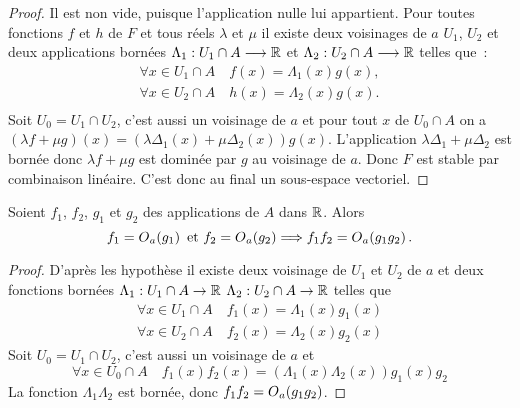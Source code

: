 \begin{proof}
  Il est non vide, puisque l'application nulle lui appartient. Pour toutes 
  fonctions \(f\) et \(h\) de \(F\) et tous réels \(\lambda\) et \(\mu\) il 
  existe deux voisinages de \(a\) \(U_1\), \(U_2\) et deux  applications bornées 
  \(\Lambda_1:U_1 \cap A \longrightarrow \mathbb{R}\) et \(\Lambda_2:U_2 \cap A 
  \longrightarrow \mathbb{R}\)  telles que~:
  \begin{gather}
    \forall x \in U_1\cap A \quad f(x)=\Lambda_1(x)g(x),\\
    \forall x \in U_2\cap A \quad h(x)=\Lambda_2(x)g(x).\\
  \end{gather}
  Soit \(U_0=U_1 \cap U_2\), c'est aussi un voisinage de \(a\) et pour tout 
  \(x\) de \(U_0 \cap A\) on a \((\lambda f +\mu 
  g)(x)=(\lambda\Delta_1(x)+\mu\Delta_2(x))g(x)\). L'application 
  \(\lambda\Delta_1+\mu\Delta_2\) est bornée donc \(\lambda f + \mu g\) est 
  dominée par \(g\) au voisinage de \(a\). Donc \(F\) est stable par combinaison 
  linéaire. C'est donc au final un sous-espace vectoriel.
\end{proof}
\begin{prop}
  Soient \(f_1\), \(f_2\), \(g_1\) et \(g_2\) des applications de \(A\) dans 
  \(\mathbb{R}\). Alors
  \begin{equation}
    f_1=O\mathopen{}_{a}\left(g_1\right) \text{~et~} f_2=O\mathopen{}_{a}\left(g_2\right) \Longrightarrow f_1f_2 
    = O\mathopen{}_{a}\left(g_1g_2\right).
  \end{equation}
\end{prop}
\begin{proof}
  D'après les hypothèse il existe deux voisinage de \(U_1\) et \(U_2\) de \(a\) 
  et deux fonctions bornées \(\Lambda_1:U_1 \cap A \rightarrow \mathbb{R}\) 
  \(\Lambda_2:U_2 \cap A \rightarrow \mathbb{R}\) telles que
  \begin{align}
    \forall x \in U_1\cap A \quad f_1(x)=\Lambda_1(x)g_1(x)\\
    \forall x \in U_2\cap A \quad f_2(x)=\Lambda_2(x)g_2(x)
  \end{align}
  Soit \(U_0=U_1 \cap U_2\), c'est aussi un voisinage de \(a\) et
  \begin{equation}
    \forall x \in U_0 \cap A \quad f_1(x)f_2(x) = (\Lambda_1(x) \Lambda_2(x)) 
    g_1(x)g_2
  \end{equation}
  La fonction \(\Lambda_1 \Lambda_2\) est bornée, donc \(f_1f_2 = 
  O\mathopen{}_{a}\left(g_1g_2\right)\).
\end{proof}

